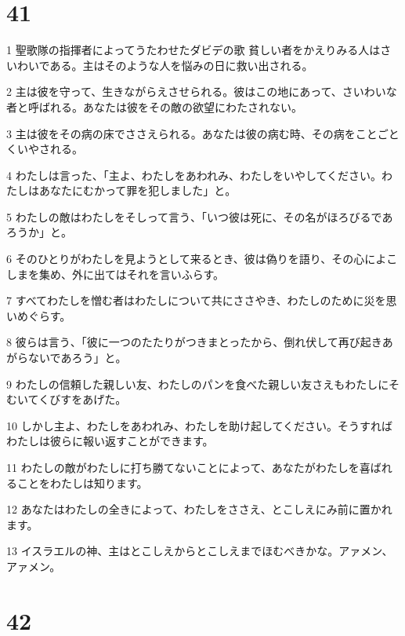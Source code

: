 \chapter{41}

\par 1 聖歌隊の指揮者によってうたわせたダビデの歌 貧しい者をかえりみる人はさいわいである。主はそのような人を悩みの日に救い出される。
\par 2 主は彼を守って、生きながらえさせられる。彼はこの地にあって、さいわいな者と呼ばれる。あなたは彼をその敵の欲望にわたされない。
\par 3 主は彼をその病の床でささえられる。あなたは彼の病む時、その病をことごとくいやされる。
\par 4 わたしは言った、「主よ、わたしをあわれみ、わたしをいやしてください。わたしはあなたにむかって罪を犯しました」と。
\par 5 わたしの敵はわたしをそしって言う、「いつ彼は死に、その名がほろびるであろうか」と。
\par 6 そのひとりがわたしを見ようとして来るとき、彼は偽りを語り、その心によこしまを集め、外に出てはそれを言いふらす。
\par 7 すべてわたしを憎む者はわたしについて共にささやき、わたしのために災を思いめぐらす。
\par 8 彼らは言う、「彼に一つのたたりがつきまとったから、倒れ伏して再び起きあがらないであろう」と。
\par 9 わたしの信頼した親しい友、わたしのパンを食べた親しい友さえもわたしにそむいてくびすをあげた。
\par 10 しかし主よ、わたしをあわれみ、わたしを助け起してください。そうすればわたしは彼らに報い返すことができます。
\par 11 わたしの敵がわたしに打ち勝てないことによって、あなたがわたしを喜ばれることをわたしは知ります。
\par 12 あなたはわたしの全きによって、わたしをささえ、とこしえにみ前に置かれます。
\par 13 イスラエルの神、主はとこしえからとこしえまでほむべきかな。アァメン、アァメン。

\chapter{42}

